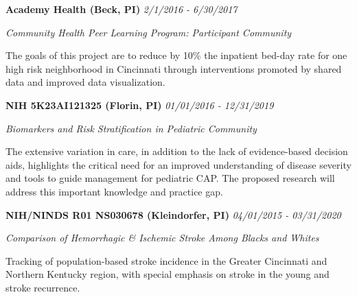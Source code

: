\documentclass[margin,line]{res}
\newenvironment{list3}{
  \begin{list}{}{%
      \setlength{\itemsep}{0in}
      \setlength{\parsep}{0in} \setlength{\parskip}{0in}
      \setlength{\topsep}{0in} \setlength{\partopsep}{0in} 
      \setlength{\leftmargin}{0in}}}{\end{list}}
\begin{document}
\begin{resume}
\vspace*{.1in}

\begin{list3} \itemsep 4pt
    \item[] \textbf{Academy Health (Beck, PI)} \hfill \textit{2/1/2016 - 6/30/2017}
\item[] \textit{Community Health Peer Learning Program: Participant Community}
\item[] The goals of this project are to reduce by 10\% the inpatient bed-day rate for one high risk neighborhood in Cincinnati through interventions promoted by shared data and improved data visualization.
\end{list3}

\vspace*{.1in}

\begin{list3} \itemsep 4pt
    \item[] \textbf{NIH 5K23AI121325 (Florin, PI)} \hfill \textit{01/01/2016 - 12/31/2019}
\item[] \textit{Biomarkers and Risk Stratification in Pediatric Community}
\item[] The extensive variation in care, in addition to the lack of evidence-based decision aids, highlights the critical need for an improved understanding of disease severity and tools to guide management for pediatric CAP. The proposed research will address this important knowledge and practice gap.

\end{list3}

\vspace*{.1in}

\begin{list3} \itemsep 4pt
    \item[] \textbf{NIH/NINDS R01 NS030678 (Kleindorfer, PI)} \hfill \textit{04/01/2015 - 03/31/2020}
    \item[] \textit{Comparison of Hemorrhagic \& Ischemic Stroke Among Blacks and Whites}
\item[] Tracking of population-based stroke incidence in the Greater Cincinnati and Northern Kentucky region, with special emphasis on stroke in the young and stroke recurrence. 
\end{list3}

\vspace*{.1in}


\end{resume}
\end{document}
